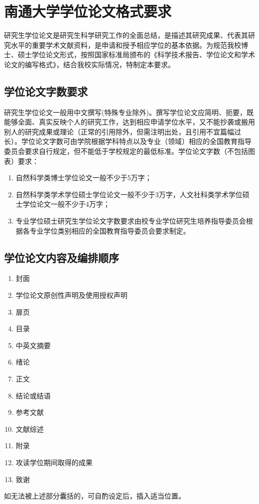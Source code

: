 \chapter{南通大学学位论文格式要求}\label{appendix:ntuthesisrule}

研究生学位论文是研究生科学研究工作的全面总结，是描述其研究成果、代表其研究水平的重要学术文献资料，是申请和授予相应学位的基本依据。为规范我校博士、硕士学位论文形式，按照国家标准局颁布的《科学技术报告、学位论文和学术论文的编写格式》，结合我校实际情况，特制定本要求。

\section{学位论文字数要求}
研究生学位论文一般用中文撰写(特殊专业除外)。撰写学位论文应简明、扼要，既能够全面、真实反映个人的研究工作，达到相应申请学位水平，又不能抄袭或搬用别人的研究成果或理论（正常的引用除外，但需注明出处，且引用不宜篇幅过长）。学位论文字数可由学院根据学科特点以及专业（领域）相应的全国教育指导委员会要求自行规定，但不能低于学校规定的最低标准。学位论文字数（不包括图表）要求：
\begin{enumerate}
\item 自然科学类博士学位论文一般不少于5万字；
\item 自然科学类学术学位硕士学位论文一般不少于3万字，人文社科类学术学位硕士学位论文一般不少于4万字；
\item 专业学位硕士研究生学位论文字数要求由校专业学位研究生培养指导委员会根据各专业学位类别相应的全国教育指导委员会要求制定。
\end{enumerate}

\section{学位论文内容及编排顺序}
\begin{enumerate}
\item 封面
\item 学位论文原创性声明及使用授权声明
\item 扉页
\item 目录
\item 中英文摘要
\item 绪论
\item 正文
\item 结论或结语
\item 参考文献
\item 文献综述
\item 附录
\item 攻读学位期间取得的成果
\item 致谢
\end{enumerate}
如无法被上述部分囊括的，可自酌设定后，插入适当位置。

